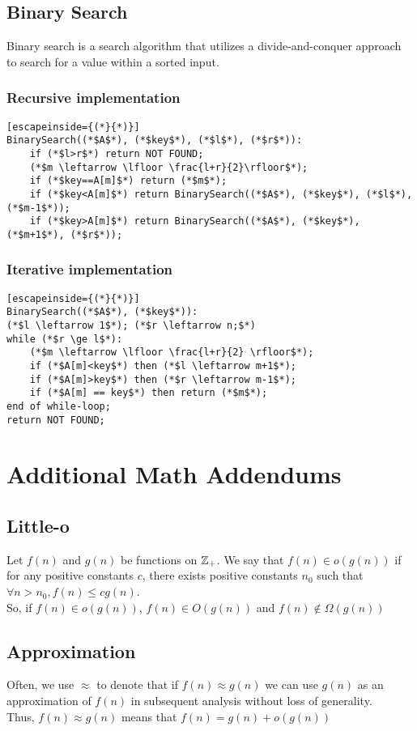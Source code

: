 \documentclass[a4paper]{article}
\begin{document}
\subsection{Binary Search}
Binary search is a search algorithm that utilizes a divide-and-conquer approach to search for a value within a sorted input.
\subsubsection{Recursive implementation}
\begin{lstlisting}[escapeinside={(*}{*)}]
BinarySearch((*$A$*), (*$key$*), (*$l$*), (*$r$*)):
	if (*$l>r$*) return NOT FOUND;
	(*$m \leftarrow \lfloor \frac{l+r}{2}\rfloor$*);
	if (*$key==A[m]$*) return (*$m$*);
	if (*$key<A[m]$*) return BinarySearch((*$A$*), (*$key$*), (*$l$*), (*$m-1$*));
	if (*$key>A[m]$*) return BinarySearch((*$A$*), (*$key$*), (*$m+1$*), (*$r$*)); 
\end{lstlisting}

\subsubsection{Iterative implementation}
\begin{lstlisting}[escapeinside={(*}{*)}]
BinarySearch((*$A$*), (*$key$*)):
(*$l \leftarrow 1$*); (*$r \leftarrow n;$*)
while (*$r \ge l$*):
	(*$m \leftarrow \lfloor \frac{l+r}{2} \rfloor$*);
	if (*$A[m]<key$*) then (*$l \leftarrow m+1$*);
	if (*$A[m]>key$*) then (*$r \leftarrow m-1$*);
	if (*$A[m] == key$*) then return (*$m$*);
end of while-loop;
return NOT FOUND;
\end{lstlisting}

\section{Additional Math Addendums}

\subsection{Little-o}
Let $f(n)$ and $g(n)$ be functions on $\mathbb{Z}_{+}$. We say that $f(n) \in o(g(n))$ if for any positive constants $c$, there exists positive constants $n_0$ such that $\forall n > n_0, f(n) \le cg(n)$.\\
So, if $f(n) \in o(g(n))$, $f(n) \in O(g(n))$ and $f(n) \notin \Omega(g(n))$

\subsection{Approximation}
Often, we use $\approx$ to denote that if $f(n) \approx g(n)$ we can use $g(n)$ as an approximation of $f(n)$ in subsequent analysis without loss of generality.\\
Thus, $f(n) \approx g(n)$ means that $f(n) = g(n) + o(g(n))$
\end{document}
